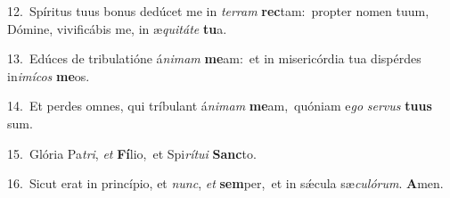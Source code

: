 {\numbfont\textcolor{\numbcolor}{12.}}~Spíritus tuus bonus dedúcet me in \textit{ter}\-\textit{ram} \textbf{rec}\-tam:~\star propter nomen tuum, Dómine, vivificábis me, in æ\-\textit{qui}\-\textit{tá}\textit{te} \textbf{tu}\-a.\par
{\numbfont\textcolor{\numbcolor}{13.}}~Edúces de tribulatióne á\-\textit{ni}\-\textit{mam} \textbf{me}\-am:~\star et in misericórdia tua dispérdes in\-\textit{i}\-\textit{mí}\textit{cos} \textbf{me}\-os.\par
{\numbfont\textcolor{\numbcolor}{14.}}~Et perdes omnes, qui tríbulant á\-\textit{ni}\-\textit{mam} \textbf{me}\-am,~\star quóniam e\textit{go} \textit{ser}\-\textit{vus} \textbf{tu}\-\textbf{us} sum.\par
{\numbfont\textcolor{\numbcolor}{15.}}~Glória Pa\-\textit{tri}\-, \textit{et} \textbf{Fí}\-lio,~\star et Spi\-\textit{rí}\-\textit{tu}\textit{i} \textbf{Sanc}\-to.\par
{\numbfont\textcolor{\numbcolor}{16.}}~Sicut erat in princípio, et \textit{nunc}\-, \textit{et} \textbf{sem}\-per,~\star et in sǽcula sæ\-\textit{cu}\-\textit{ló}\textit{rum}. \textbf{A}\-men.\par
